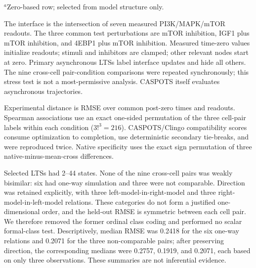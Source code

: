 \documentclass{ws-jbcb}
\numberwithin{equation}{section}
\begin{document}
\begin{table}[t]
\begin{tabnote}$^a$Zero-based row; selected from model structure only.\end{tabnote}
\end{table}

The interface is the intersection of seven measured PI3K/MAPK/mTOR readouts.
The three common test perturbations are mTOR inhibition, IGF1 plus mTOR
inhibition, and 4EBP1 plus mTOR inhibition. Measured time-zero values initialize
readouts; stimuli and inhibitors are clamped; other relevant nodes start at zero.
Primary asynchronous LTSs label interface updates and hide all others. The nine
cross-cell pair-condition comparisons were repeated synchronously; this stress
test is not a most-permissive analysis. CASPOTS itself evaluates asynchronous
trajectories.\cite{Pauleve2020,Razzaq2018}

Experimental distance is RMSE over common post-zero times and readouts. Spearman
associations use an exact one-sided permutation of the three cell-pair labels
within each condition ($3!^3=216$). CASPOTS/Clingo compatibility scores consume
optimization to completion, use deterministic secondary tie-breaks, and were
reproduced twice. Native specificity uses the exact sign permutation of three
native-minus-mean-cross differences.

Selected LTSs had 2--44 states. None of the nine cross-cell pairs was weakly
bisimilar: six had one-way simulation and three were not comparable. Direction
was retained explicitly, with three left-model-in-right-model and three
right-model-in-left-model relations. These categories do not form a justified
one-dimensional order, and the held-out RMSE is symmetric between each cell
pair. We therefore removed the former ordinal class coding and performed no
scalar formal-class test. Descriptively, median RMSE was 0.2418 for the six
one-way relations and 0.2071 for the three non-comparable pairs; after preserving
direction, the corresponding medians were 0.2757, 0.1919, and 0.2071, each based
on only three observations. These summaries are not inferential evidence.
\end{document}
